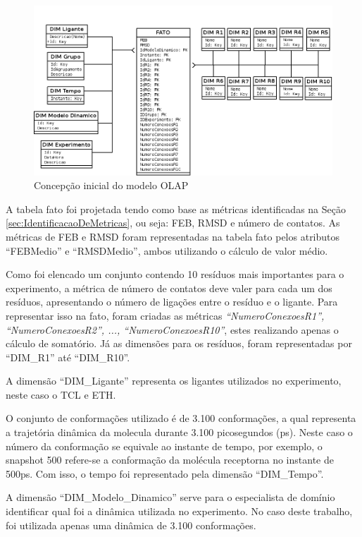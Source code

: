 \begin{figure}[h]
        \center
        \includegraphics[scale=0.45]{images/Modelo_OLAP.png}
        \caption{Concepção inicial do modelo OLAP}
        \label{fig:ConcepcaoModeloOLAP}
\end{figure}

A tabela fato foi projetada tendo como base as métricas identificadas na Seção \ref{sec:IdentificacaoDeMetricas}, ou seja: FEB, RMSD e número de contatos. As métricas de FEB e RMSD foram representadas na tabela fato pelos atributos ``FEBMedio'' e ``RMSDMedio'', ambos utilizando o cálculo de valor médio.

Como foi elencado um conjunto contendo 10 resíduos mais importantes para o experimento, a métrica de número de contatos deve valer para cada um dos resíduos, apresentando o número de ligações entre o resíduo e o ligante. Para representar isso na fato, foram criadas as métricas \emph{``NumeroConexoesR1'', ``NumeroConexoesR2'', ..., ``NumeroConexoesR10''}, estes realizando apenas o cálculo de somatório. Já as dimensões para os resíduos, foram representadas por ``DIM\_R1'' até ``DIM\_R10''.

A dimensão ``DIM\_Ligante'' representa os ligantes utilizados no experimento, neste caso o TCL e ETH.

O conjunto de conformações utilizado é de 3.100 conformações, a qual representa a trajetória dinâmica da molecula durante 3.100 picosegundos (ps). Neste caso o número da conformação se equivale ao instante de tempo, por exemplo, o snapshot 500 refere-se a conformação da molécula receptorna no instante de 500ps. Com isso, o tempo foi representado pela dimensão ``DIM\_Tempo''. 

A dimensão ``DIM\_Modelo\_Dinamico'' serve para o especialista de domínio identificar qual foi a dinâmica utilizada no experimento. No caso deste trabalho, foi utilizada apenas uma dinâmica de 3.100 conformações.

